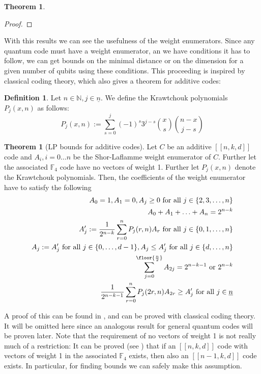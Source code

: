 \documentclass{article}
\def\N{\mathbb{N}}
\def\F{\mathbb{F}}
\def\n{\underline{n}}
\def\fa{\text{ for all }}
\theoremstyle{definition}
\newtheorem{theorem}[Satz]{Theorem}
\newtheorem{defn}[Satz]{Definition}
\begin{document}
\begin{theorem}
\begin{proof}
\end{proof}

\end{theorem}

With this results we can see the usefulness of the weight enumerators. Since any quantum code must have a weight enumerator, an we have conditions it has to follow, we can get bounds on the minimal distance or on the dimension for a given number of qubits using these conditions.
This proceeding is inspired by classical coding theory, which also gives a theorem for additive codes:

\begin{defn}
Let $n \in \N, j \in \n$. We define the Krawtchouk polynomials $P_j(x,n)$ as follows: 
\begin{equation}
P_j(x,n) := \sum_{s=0}^j (-1)^s 3^{j-s} \binom{x}{s}\binom{n-x}{j-s}
\end{equation}
\end{defn}

\begin{theorem}[LP bounds for additive codes]\label{lpadditive}
Let $C$ be an additive $[[n,k,d]]$ code and $A_i, i = 0 \ldots n$ be the Shor-Laflamme weight enumerator of $C$. Further let the associated $\F_4$ code have no vectors of weight 1.
Further let $P_j(x,n)$ denote the Krawtchouk polynomials.  Then, the coefficients of the weight enumerator have to satisfy the following
\begin{align} 
A_0 = 1, A_1 = 0, A_j \geq 0 \text{ for all } j \in \{ 2,3, \ldots, n \} \\
A_0 + A_1 + \ldots + A_n = 2^{n-k} \\
A'_j := \frac{1}{2^{n-k}} \sum_{r = 0}^n P_j(r,n) A_r  \text{ for all } j \in \{ 0,1, \ldots, n \} \\
A_j := A'_j \text{ for all } j \in \{0, \ldots, d-1 \}, A_j \leq A'_j \fa j \in \{d, \ldots, n \} \\
\sum_{j=0}^{\floor{\frac{n}{2}}} A_{2j} = 2^{n-k-1} \text{ or } 2^{n-k} \\
\frac{1}{2^{n-k-1}} \sum_{r=0}^n P_j(2r,n)A_{2r} \geq A'_j \fa j \in \n
\end{align}

A proof of this can be found in \cite{gf4}, and can be proved with classical coding theory. It will be omitted here since an analogous result for general quantum codes will be proven later.
Note that the requirement of no vectors of weight 1 is not really much of a restriction: It can be proved (see \cite{gf4}) that if an $[[n,k,d]]$ code with vectors of weight 1 in the associated $\F_4$ exists,
then also an $[[n-1,k,d]]$ code exists. In particular, for finding bounds we can safely make this assumption.
\end{theorem}
\end{document}
